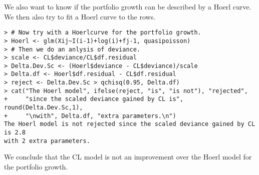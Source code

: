 \documentclass[11pt]{article}
\begin{document}
We also want to know if the portfolio growth can be described by a Hoerl curve. We then also try to fit a Hoerl curve to the rows.

\begin{verbatim}
> # Now try with a Hoerlcurve for the portfolio growth.
> Hoerl <- glm(Xij~I(i-1)+log(i)+fj-1, quasipoisson)
> # Then we do an anlysis of deviance.
> scale <- CL$deviance/CL$df.residual
> Delta.Dev.Sc <- (Hoerl$deviance - CL$deviance)/scale
> Delta.df <- Hoerl$df.residual - CL$df.residual
> reject <- Delta.Dev.Sc > qchisq(0.95, Delta.df)
> cat("The Hoerl model", ifelse(reject, "is", "is not"), "rejected",
+     "since the scaled deviance gained by CL is", round(Delta.Dev.Sc,1),
+     "\nwith", Delta.df, "extra parameters.\n")
The Hoerl model is not rejected since the scaled deviance gained by CL is 2.8 
with 2 extra parameters.
\end{verbatim}

We conclude that the CL model is not an improvement over the Hoerl model for the portfolio growth.
\end{document}
